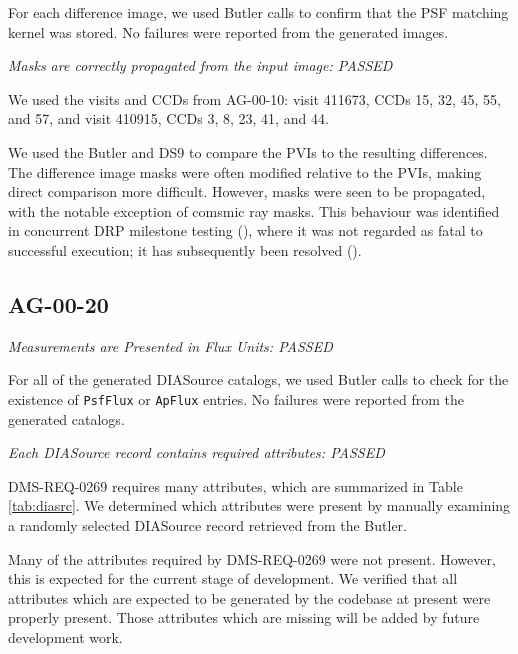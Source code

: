 \documentclass[DM,lsstdraft,STR,toc]{lsstdoc}
\begin{document}
For each difference image, we used Butler calls to confirm that the PSF matching kernel was stored.  No failures were reported from the generated images.

\textit{Masks are correctly propagated from the input image: PASSED}

We used the visits and CCDs from AG-00-10:
visit 411673, CCDs 15, 32, 45, 55, and 57, and
visit 410915, CCDs 3,  8, 23, 41, and 44.

We used the Butler and DS9 to compare the PVIs to the resulting differences.
The difference image masks were often modified relative to the PVIs, making
direct comparison more difficult. However, masks were seen to be propagated,
with the notable exception of comsmic ray masks. This behaviour was identified
in concurrent DRP milestone testing (), where it was not
regarded as fatal to successful execution; it has subsequently been resolved
().

\subsection{AG-00-20}
\label{sect:ag-00-20}

\textit{Measurements are Presented in Flux Units: PASSED }

For all of the generated DIASource catalogs, we used Butler calls to check for
the existence of \texttt{PsfFlux} or \texttt{ApFlux} entries.  No failures were
reported from the generated catalogs.

\textit{Each DIASource record contains required attributes: PASSED}

DMS-REQ-0269 requires many attributes, which are summarized in Table
\ref{tab:diasrc}.  We determined which attributes were present by manually
examining a randomly selected DIASource record retrieved from the Butler.

Many of the attributes required by DMS-REQ-0269 were not present. However, this
is expected for the current stage of development. We verified that all
attributes which are expected to be generated by the codebase at present were
properly present. Those attributes which are missing will be added by future
development work.
\end{document}
